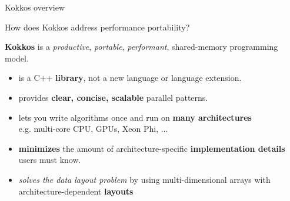 \begin{frame}[fragile]{Kokkos overview}

  How does Kokkos address performance portability?

  \vspace{10pt}

  \textbf{Kokkos} is a \emph{productive}, \emph{portable}, \emph{performant}, shared-memory programming model.

  \begin{itemize}
    \item{is a C++ \textbf{library}, not a new language or language extension.}
    \item{provides \textbf{clear, concise, scalable} parallel patterns.}
    \item{lets you write algorithms once and run on \textbf{many architectures} \\
          \hspace{20pt}e.g. multi-core CPU, GPUs, Xeon Phi, ...}
    \item{\textbf{minimizes} the amount of architecture-specific \textbf{implementation details} users must know.}
    \item{\emph{solves the data layout problem} by using multi-dimensional arrays with architecture-dependent \textbf{layouts}} \\
  \end{itemize}

\end{frame}


